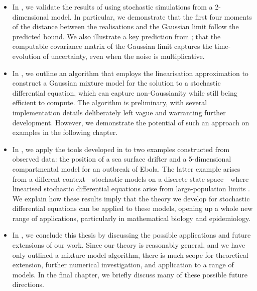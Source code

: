 \begin{itemize}
\begin{itemize}
	      \end{itemize}

	\item In , we validate the results of  using stochastic simulations from a 2-dimensional model.
	      In particular, we demonstrate that the first four moments of the distance between the realisations and the Gaussian limit follow the predicted bound.
	      We also illustrate a key prediction from ; that the computable covariance matrix of the Gaussian limit captures the time-evolution of uncertainty, even when the noise is multiplicative.

	\item In , we outline an algorithm that employs the linearisation approximation to construct a Gaussian mixture model for the solution to a stochastic differential equation, which can capture non-Gaussianity while still being efficient to compute.
	      The algorithm is preliminary, with several implementation details deliberately left vague and warranting further development.
	      However, we demonstrate the potential of such an approach on examples in the following chapter.

	\item In , we apply the tools developed in  to two examples constructed from observed data: the position of a sea surface drifter and a 5-dimensional compartmental model for an outbreak of Ebola.
	      The latter example arises from a different context---stochastic models on a discrete state space---where linearised stochastic differential equations arise from large-population limits \citep{Kurtz_1970_SolutionsOrdinaryDifferential,Kurtz_1971_LimitTheoremsSequences}.
	      We explain how these results imply that the theory we develop for stochastic differential equations can be applied to these models, opening up a whole new range of applications, particularly in mathematical biology and epidemiology.

	\item In , we conclude this thesis by discussing the possible applications and future extensions of our work.
	      Since our theory is reasonably general, and we have only outlined a mixture model algorithm, there is much scope for theoretical extension, further numerical investigation, and application to a range of models.
	      In the final chapter, we briefly discuss many of these possible future directions.


\end{itemize}

